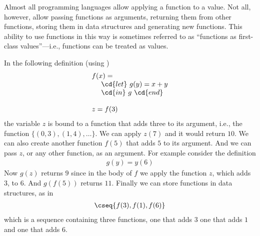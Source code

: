 \begin{flex}
\begin{gram}
Almost all programming languages allow applying a function to a
value.  Not all, however, allow passing functions as arguments, returning
them from other functions, storing them in data structures and
generating new functions.
This ability to use functions in this way is sometimes referred to as
``functions as first-class values''---i.e., functions can be treated
as values.
\end{gram}

\begin{example}
In the following definition (using \pml{})
\[
\begin{array}{l}
f(x) =
\\
~~~~\cd{let}~g(y) = x + y 
\\
~~~~\cd{in}~g~\cd{end}
\\
\\
z = f(3)
\end{array}
\]
the variable $z$ is bound to a function that adds three to its argument, i.e., the function $\{(0,3),(1,4),\ldots\}$.   We
can apply $z(7)$ and it would return $10$.   We can also create
another function $f(5)$ that adds $5$ to its argument.
And we can pass $z$, or any other function, as an argument.   For
example consider the definition
\[
\begin{array}{l}
g(y) = y(6) 
\end{array}
\]
Now $g(z)$ returns $9$ since in the body of $f$ we apply the
function $z$, which adds $3$, to $6$.   And $g(f(5))$ returns $11$.
Finally we can store functions in data structures, as in 
\[
\begin{array}{l}
\cseq{f(3), f(1), f(6)}
\end{array}
\]
which is a sequence containing three functions, one that adds $3$ one
that adds $1$ and one that adds $6$.
\end{example}
\end{flex}

